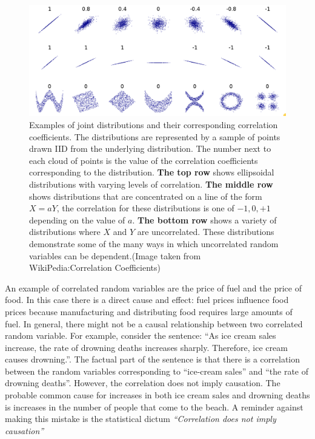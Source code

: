 \begin{figure}[tb]
\begin{center}
\includegraphics[width=5in]{figs/correlationCoefficients.png}
\end{center}
\caption{\label{fig:corrCoeff} Examples of joint distributions and
  their corresponding correlation coefficients. The distributions are
  represented by a sample of points drawn IID from the underlying
  distribution. The number next to each cloud of points is the value 
  of the correlation coefficients corresponding to the distribution. 
{\bf The top row} shows ellipsoidal distributions with varying levels of
correlation. {\bf The middle row} shows distributions that are concentrated
on a line of the form $X=aY$, the correlation for these distributions
is one of $-1,0,+1$ depending on the value of $a$. {\bf The bottom
  row} shows a variety of distributions where $X$ and $Y$ are
uncorrelated. These distributions demonstrate some of the many ways in
which uncorrelated random variables can be dependent.(Image taken from
WikiPedia:Correlation Coefficients)}
\end{figure}

An example of correlated random variables are the
price of fuel and the price of food. In this case there is a
direct cause and effect: fuel prices influence food prices because
manufacturing and distributing food requires large amounts of fuel. In
general, there might not be a causal relationship between two
correlated random variable. For example, consider the sentence: ``As
ice cream sales increase, the rate of drowning deaths increases
sharply. Therefore, ice cream causes drowning.''. The factual part of
the sentence is that there is a correlation between the random
variables corresponding to ``ice-cream sales'' and ``the rate of
drowning deaths''. However, the correlation does not imply
causation. The probable common cause for increases in both ice cream sales and
drowning deaths is increases in the number of people that come to the beach.  A
reminder against making this mistake is the statistical dictum
{\em ``Correlation does not imply causation''}

